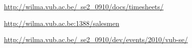 \documentclass{article}
\begin{document}
\begin{thebibliography}{99}

	\href{http://wilma.vub.ac.be/~se2_0910/docs/timesheets/}{http://wilma.vub.ac.be/~se2_0910/docs/timesheets/}
	
	\href{http://wilma.vub.ac.be:1388/salesmen}{http://wilma.vub.ac.be:1388/salesmen}
	
	\href{http://wilma.vub.ac.be/~se2_0910/dev/events/2010/vub-se/}{http://wilma.vub.ac.be/~se2_0910/dev/events/2010/vub-se/}
	
\end{thebibliography}
\end{document}
